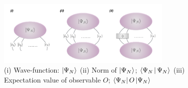 \begin{figure}[b]
	\centering
	\includegraphics[width=0.75\textwidth]{figures/fig225.png}
	\caption[Represent wave-function of quntum states of TN]{(i) Wave-function: $\Ket{\Psi_N}$ (ii) Norm of $\Ket{\Psi_N}$; $\Braket{\Psi_N|\Psi_N}$ (iii) Expectation value of observable $O$; $\Bra{\Psi_N}O\Ket{\Psi_N}$}
	\label{fig225}
\end{figure}
